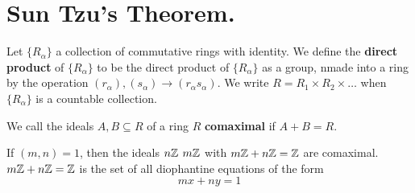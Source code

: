 \section{Sun Tzu's Theorem.}

\begin{definition}
    Let $\{R_\alpha\}$ a collection of commutative rings with identity. We
    define the \textbf{direct product} of $\{R_\alpha\}$ to be the direct product
    of $\{R_\alpha\}$ as a group, nmade into a ring by the operation $(r_\alpha),
    (s_\alpha) \xrightarrow{} (r_\alpha s_\alpha)$. We write $R=R_1 \times R_2
    \times \dots$ when $\{R_\alpha\}$ is a countable collection.
\end{definition}

\begin{definition}
    We call the ideals $A,B \subseteq R$ of a ring $R$ \textbf{comaximal} if
    $A+B=R$.
\end{definition}

\begin{example}\label{1.19}
    If $(m,n)=1$, then the ideals $n\mathbb{Z}$  $m\mathbb{Z}$ with  $m\mathbb{Z}+n\mathbb{Z}=\mathbb{Z}$ are comaximal.
     $m\mathbb{Z}+n\mathbb{Z}=\mathbb{Z}$ is the set of all diophantine equations of the form
     \begin{equation*}
         mx+ny=1
     \end{equation*}
\end{example}

